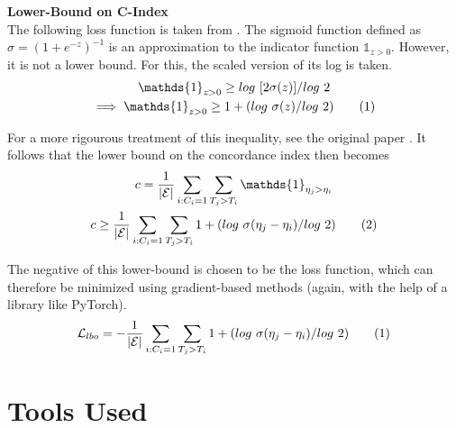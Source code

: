 \documentclass[%
 twocolumn,
 reprint,
 amsmath,amssymb,
 aps,nofootinbib
]{revtex4-2}
\newcommand\numberthis{\addtocounter{equation}{1}\tag{\theequation}} %
\begin{document}
\textbf{Lower-Bound on C-Index}\\
The following loss function is taken from \cite{raykar_cindex}. The sigmoid function defined as $\sigma = (1 + e^{-z})^{-1}$ is an approximation to the indicator function $\mathds{1}_{z>0}$. However, it is not a lower bound. For this, the scaled version of its log is taken.
\begin{gather*}
\mathds{1}_{z>0} \ge log\ [2\sigma(z)]/log\ 2\\
\implies \mathds{1}_{z>0} \ge 1 + (log\ \sigma(z)/log\ 2) \numberthis  \label{eq:cindex_inequality}
\end{gather*}

For a more rigourous treatment of this inequality, see the original paper \cite{raykar_cindex}. It follows that the lower bound on the concordance index then becomes
\begin{gather*}
c = \frac{1}{|\mathcal{E}|}\sum_{i:C_i = 1}\sum_{T_j > T_i} \mathds{1}_{\eta_j > \eta_i}\\
c \ge \frac{1}{|\mathcal{E}|}\sum_{i:C_i = 1}\sum_{T_j > T_i} 1 +  (log\ \sigma(\eta_j - \eta_i)/log\ 2) \numberthis  \label{eq:cindex_lbo}
\end{gather*}

The negative of this lower-bound is chosen to be the loss function, which can therefore be minimized using gradient-based methods (again, with the help of a library like PyTorch).
\[
\mathcal{L}_{lbo} = -\frac{1}{|\mathcal{E}|}\sum_{i:C_i = 1}\sum_{T_j > T_i} 1 +  (log\ \sigma(\eta_j - \eta_i)/log\ 2) \numberthis  \label{eq:l_lbo}
\]


\section{\label{appdx2}Tools Used}
\end{document}
